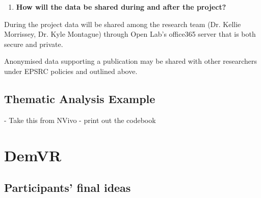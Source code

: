 \begin{enumerate}[resume]
\item \textbf{How will the data be shared during and after the project?} 
\end{enumerate}
During the project data will be shared among the research team (Dr. Kellie Morrissey, Dr. Kyle Montague) through Open Lab’s office365 server that is both secure and private. 

Anonymised data supporting a publication may be shared with other researchers under EPSRC policies and outlined above. 



\newpage
\section{Thematic Analysis Example}
\label{app:TA}
- Take this from NVivo - print out the codebook
\chapter{DemVR}

\section{Participants' final ideas}
\label{sec:EventIdeas}

